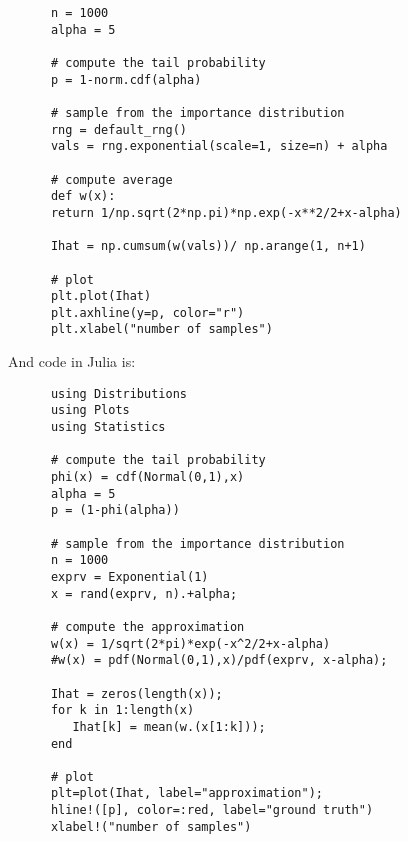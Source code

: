 \begin{exenumerate}
\begin{solution}
\begin{lstlisting}
      n = 1000
      alpha = 5

      # compute the tail probability
      p = 1-norm.cdf(alpha)

      # sample from the importance distribution
      rng = default_rng()
      vals = rng.exponential(scale=1, size=n) + alpha

      # compute average
      def w(x):
      return 1/np.sqrt(2*np.pi)*np.exp(-x**2/2+x-alpha)

      Ihat = np.cumsum(w(vals))/ np.arange(1, n+1)

      # plot
      plt.plot(Ihat)
      plt.axhline(y=p, color="r")
      plt.xlabel("number of samples")
\end{lstlisting}
    
    And code in Julia is:
    \begin{lstlisting}
      using Distributions
      using Plots
      using Statistics

      # compute the tail probability
      phi(x) = cdf(Normal(0,1),x)
      alpha = 5
      p = (1-phi(alpha))

      # sample from the importance distribution
      n = 1000
      exprv = Exponential(1)
      x = rand(exprv, n).+alpha;

      # compute the approximation
      w(x) = 1/sqrt(2*pi)*exp(-x^2/2+x-alpha)
      #w(x) = pdf(Normal(0,1),x)/pdf(exprv, x-alpha);  

      Ihat = zeros(length(x));
      for k in 1:length(x)
         Ihat[k] = mean(w.(x[1:k]));
      end

      # plot
      plt=plot(Ihat, label="approximation");
      hline!([p], color=:red, label="ground truth")
      xlabel!("number of samples")
\end{lstlisting}
    
  \end{solution}
  
\end{exenumerate}


